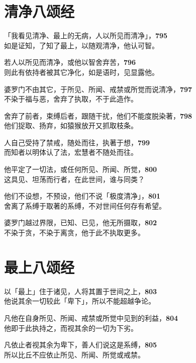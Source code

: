 \section{清净八颂经}


「我看见清净、最上的无病，人以所见而清净」，\hfill{\grayfootnotesize \textbf{795}} \\
如是证知，了知了最上，以随观清净，他认可智。


若人以所见而清净，或他以智舍弃苦，\hfill{\grayfootnotesize \textbf{796}} \\
则此有依持者被其它净化，如是语时，见显露他。


婆罗门不由其它，于所见、所闻、戒禁或所觉而说清净，\hfill{\grayfootnotesize \textbf{797}} \\
不染于福与恶，舍弃了执取，不于此造作。


舍弃了前者，束缚后者，跟随干扰，他们不能度脱染著，\hfill{\grayfootnotesize \textbf{798}} \\
他们捉取、扬弃，如猿猴放开又抓取枝条。


人自己受持了禁戒，随处而往，执著于想，\hfill{\grayfootnotesize \textbf{799}} \\
而知者以明体认了法，宏慧者不随处而往。


他平定了一切法，或任何所见、所闻、所觉，\hfill{\grayfootnotesize \textbf{800}} \\
这具见、坦荡而行者，在此世间，谁与同类？


他们不设想，不预设，他们不说「极度清净」，\hfill{\grayfootnotesize \textbf{801}} \\
舍离了系缚于取著的系缚，不对世间任何存有希望。


婆罗门越过界限，已知、已见，他无所摄取，\hfill{\grayfootnotesize \textbf{802}} \\
不染于贪，不染于离贪，他于此不执取更多。


\section{最上八颂经}


以「最上」住于诸见，人将其置于世间之上，\hfill{\grayfootnotesize \textbf{803}} \\
他说其余一切较此「卑下」，所以不能超越争论。


凡他在自身所见、所闻、戒禁或所觉中见到的利益，\hfill{\grayfootnotesize \textbf{804}} \\
他即于此执持之，而视其余的一切为下劣。


凡依止者视其余为卑下，善人们说这是系缚，\hfill{\grayfootnotesize \textbf{805}} \\
所以比丘不应依止所见、所闻、所觉或戒禁。


